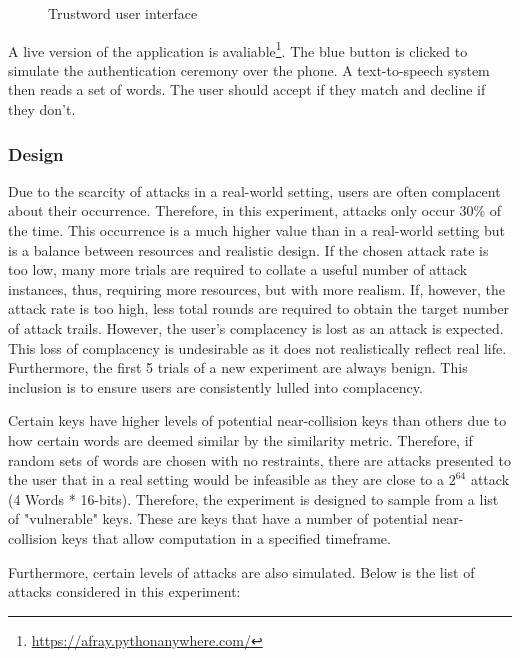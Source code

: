\begin{figure}[h!]
    \centering
    \begin{adjustbox}{width=0.4\textwidth,center}
    \end{adjustbox}
    \caption{Trustword user interface}
    \label{fig:trustwordUI}
\end{figure}


A live version of the application is avaliable\footnote{\url{https://afray.pythonanywhere.com/}}. The blue button is clicked to simulate the authentication ceremony over the phone. A text-to-speech system then reads a set of words. The user should accept if they match and decline if they don't.

\subsubsection*{Design}

Due to the scarcity of attacks in a real-world setting, users are often complacent about their occurrence. Therefore, in this experiment, attacks only occur 30\% of the time. This occurrence is a much higher value than in a real-world setting but is a balance between resources and realistic design. If the chosen attack rate is too low, many more trials are required to collate a useful number of attack instances, thus, requiring more resources, but with more realism. If, however, the attack rate is too high, less total rounds are required to obtain the target number of attack trails. However, the user's complacency is lost as an attack is expected. This loss of complacency is undesirable as it does not realistically reflect real life. Furthermore, the first 5 trials of a new experiment are always benign. This inclusion is to ensure users are consistently lulled into complacency.

Certain keys have higher levels of potential near-collision keys than others due to how certain words are deemed similar by the similarity metric. Therefore, if random sets of words are chosen with no restraints, there are attacks presented to the user that in a real setting would be infeasible as they are close to a $2^{64}$ attack (4 Words * 16-bits). Therefore, the experiment is designed to sample from a list of "vulnerable" keys. These are keys that have a number of potential near-collision keys that allow computation in a specified timeframe. 

Furthermore, certain levels of attacks are also simulated. Below is the list of attacks considered in this experiment: 

